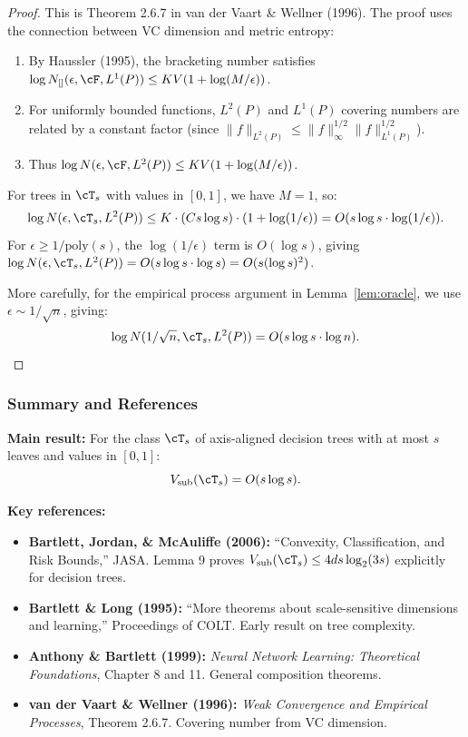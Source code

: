 \begin{proof}
This is Theorem 2.6.7 in van der Vaart \& Wellner (1996). The proof uses the connection between VC dimension and metric entropy:
\begin{enumerate}
\item By Haussler (1995), the bracketing number satisfies $\log N_{[]}(\epsilon, \cF, L^1(P)) \le K V (1 + \log(M/\epsilon))$.
\item For uniformly bounded functions, $L^2(P)$ and $L^1(P)$ covering numbers are related by a constant factor (since $\|f\|_{L^2(P)} \le \|f\|_\infty^{1/2} \|f\|_{L^1(P)}^{1/2}$).
\item Thus $\log N(\epsilon, \cF, L^2(P)) \le K V (1 + \log(M/\epsilon))$.
\end{enumerate}
For trees in $\cT_s$ with values in $[0,1]$, we have $M = 1$, so:
\[
\log N(\epsilon, \cT_s, L^2(P)) \le K \cdot (Cs \log s) \cdot (1 + \log(1/\epsilon)) = O(s \log s \cdot \log(1/\epsilon)).
\]
For $\epsilon \ge 1/\text{poly}(s)$, the $\log(1/\epsilon)$ term is $O(\log s)$, giving $\log N(\epsilon, \cT_s, L^2(P)) = O(s \log s \cdot \log s) = O(s (\log s)^2)$.

More carefully, for the empirical process argument in Lemma~\ref{lem:oracle}, we use $\epsilon \sim 1/\sqrt{n}$, giving:
\[
\log N(1/\sqrt{n}, \cT_s, L^2(P)) = O(s \log s \cdot \log n).
\]
\end{proof}

\subsubsection*{Summary and References}

\textbf{Main result:} For the class $\cT_s$ of axis-aligned decision trees with at most $s$ leaves and values in $[0,1]$:
\[
V_{\text{sub}}(\cT_s) = O(s \log s).
\]

\textbf{Key references:}
\begin{itemize}
\item \textbf{Bartlett, Jordan, \& McAuliffe (2006):} ``Convexity, Classification, and Risk Bounds,'' JASA. Lemma 9 proves $V_{\text{sub}}(\cT_s) \le 4ds \log_2(3s)$ explicitly for decision trees.
\item \textbf{Bartlett \& Long (1995):} ``More theorems about scale-sensitive dimensions and learning,'' Proceedings of COLT. Early result on tree complexity.
\item \textbf{Anthony \& Bartlett (1999):} \emph{Neural Network Learning: Theoretical Foundations}, Chapter 8 and 11. General composition theorems.
\item \textbf{van der Vaart \& Wellner (1996):} \emph{Weak Convergence and Empirical Processes}, Theorem 2.6.7. Covering number from VC dimension.
\end{itemize}

